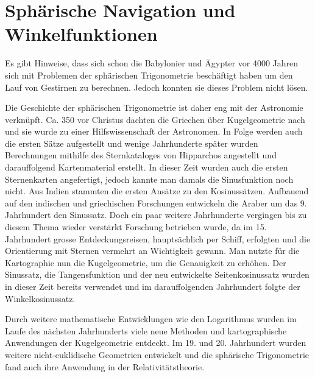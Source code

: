 


\section{Sphärische Navigation und Winkelfunktionen}
Es gibt Hinweise, dass sich schon die Babylonier und Ägypter vor 4000 Jahren sich mit Problemen der sphärischen Trigonometrie beschäftigt haben um den Lauf von Gestirnen zu berechnen. 
Jedoch konnten sie dieses Problem nicht lösen. 

Die Geschichte der sphärischen Trigonometrie ist daher eng mit der Astronomie verknüpft. Ca. 350 vor Christus dachten die Griechen über Kugelgeometrie nach und sie wurde zu einer Hilfswissenschaft der Astronomen. 
In Folge werden auch die ersten Sätze aufgestellt und wenige Jahrhunderte später wurden Berechnungen mithilfe des Sternkataloges von Hipparchos angestellt und darauffolgend Kartenmaterial erstellt.
In dieser Zeit wurden auch die ersten Sternenkarten angefertigt, jedoch kannte man damals die Sinusfunktion noch nicht. 
Aus Indien stammten die ersten Ansätze zu den Kosinussätzen.
Aufbauend auf den indischen und griechischen Forschungen entwickeln die Araber um das 9. Jahrhundert den Sinussatz. 
Doch ein paar weitere Jahrhunderte vergingen bis zu diesem Thema wieder verstärkt Forschung betrieben wurde, da im 15. Jahrhundert grosse Entdeckungsreisen, hauptsächlich per Schiff, erfolgten und die Orientierung mit Sternen vermehrt an Wichtigkeit gewann.
Man nutzte für die Kartographie nun die Kugelgeometrie, um die Genauigkeit zu erhöhen.
Der Sinussatz, die Tangensfunktion und der neu entwickelte Seitenkosinussatz wurden in dieser Zeit bereits verwendet und im darauffolgenden Jahrhundert folgte der Winkelkosinussatz. 


Durch weitere mathematische Entwicklungen wie den Logarithmus wurden im Laufe des nächsten Jahrhunderts viele neue Methoden und kartographische Anwendungen der Kugelgeometrie entdeckt. 
Im 19. und 20. Jahrhundert wurden weitere nicht-euklidische Geometrien entwickelt und die sphärische Trigonometrie fand auch ihre Anwendung in der Relativitätstheorie.